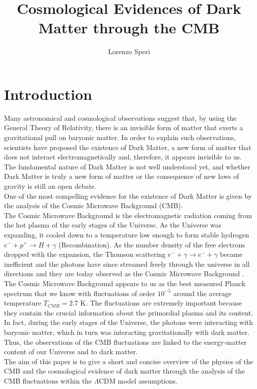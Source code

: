 \documentclass{article}
\title{Cosmological Evidences of Dark Matter through the CMB}
\author{Lorenzo Speri}
\date{}
\begin{document}
\maketitle

\vspace{3cm}
\section{Introduction}
Many astronomical and cosmological observations suggest that, by using the General Theory of Relativity, there is an invisible form of matter that exerts a gravitational pull on baryonic matter. 
In order to explain such observations, scientists have proposed the existence of Dark Matter, a new form of matter that does not interact electromagnetically and, therefore, it appears invisible to us. 
The fundamental nature of Dark Matter is not well understood yet, and whether Dark Matter is truly a new form of matter or the consequence of new laws of gravity is still an open debate.\\
One of the most compelling evidence for the existence of Dark Matter is given by the analysis of the Cosmic Microwave Background (CMB).\\
The Cosmic Microwave Background is the electromagnetic radiation coming from the hot plasma of the early stages of the Universe.
As the Universe was expanding, it cooled down to a temperature low enough to form stable hydrogen $e^- + p^+  \rightarrow H + \gamma$ (Recombination). 
As the number density of the free electrons dropped with the expansion, the Thomson scattering $e^- + \gamma  \rightarrow e^- + \gamma$ became inefficient and the photons have since streamed freely through the universe in all directions and they are today observed as the Cosmic Microwave Background \citep{LecturesPdf}.\\
The Cosmic Microwave Background appears to us as the best measured Planck spectrum that we know with fluctuations of order $10 ^{-5}$ around the average temperature $T_{CMB} =2.7$ K.
The fluctuations are extremely important because they contain the crucial information about the primordial plasma and its content. 
In fact, during the early stages of the Universe, the photons were interacting with baryonic matter, which in turn was interacting gravitationally with dark matter.
Thus, the observations of the CMB fluctuations are linked to the energy-matter content of our Universe and to dark matter.\\
The aim of this paper is to give a short and concise overview of the physics of the CMB and the cosmological evidence of dark matter through the analysis of the CMB fluctuations within the $\Lambda$CDM model assumptions.\\
\end{document}
